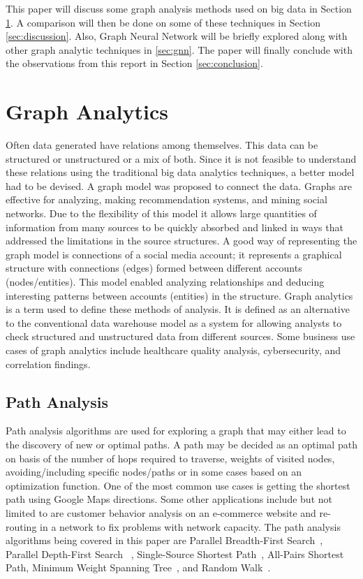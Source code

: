 \documentclass[journal,twoside,web]{ieeecolor}
\begin{document}
This paper will discuss some graph analysis methods used on big data in Section \ref{sec:lit_review}. A comparison will then be done on some of these techniques in Section \ref{sec:discussion}. Also, Graph Neural Network will be briefly explored along with other graph analytic techniques in \ref{sec:gnn}. The paper will finally conclude with the observations from this report in Section \ref{sec:conclusion}.

\section{Graph Analytics}
\label{sec:lit_review}
Often data generated have relations among themselves. This data can be structured or unstructured or a mix of both. Since it is not feasible to understand these relations using the traditional big data analytics techniques, a better model had to be devised. A graph model was proposed to connect the data. Graphs are effective for analyzing, making recommendation systems, and mining social networks. Due to the flexibility of this model it allows large quantities of information from many sources to be quickly absorbed and linked in ways that addressed the limitations in the source structures. A good way of representing the graph model is connections of a social media account; it represents a graphical structure with connections (edges) formed between different accounts (nodes/entities). This model enabled analyzing relationships and deducing interesting patterns between accounts (entities) in the structure. Graph analytics is a term used to define these methods of analysis. It is defined as an alternative to the conventional data warehouse model as a system for allowing analysts to check structured and unstructured data from different sources. Some business use cases of graph analytics include healthcare quality analysis, cybersecurity, and correlation findings.

\subsection{Path Analysis}
Path analysis algorithms are used for exploring a graph that may either lead to the discovery of new or optimal paths. A path may be decided as an optimal path on basis of the number of hops required to traverse, weights of visited nodes, avoiding/including specific nodes/paths or in some cases based on an optimization function. One of the most common use cases is getting the shortest path using Google Maps directions. Some other applications include but not limited to are customer behavior analysis on an e-commerce website and re-routing in a network to fix problems with network capacity. The path analysis algorithms being covered in this paper are Parallel Breadth-First Search~\cite{8}, Parallel Depth-First Search ~\cite{9, 10}, Single-Source Shortest Path~\cite{11}, All-Pairs Shortest Path, Minimum Weight Spanning Tree~\cite{12, 13}, and Random Walk~\cite{14}.
\end{document}
